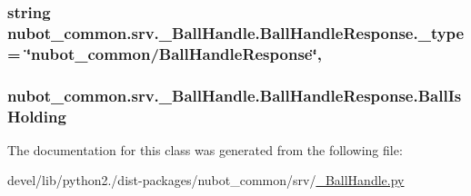 \hypertarget{classnubot__common_1_1srv_1_1__BallHandle_1_1BallHandleResponse_ac0408460ffb8e29f9d4bf262d668ecd1}{
\subsubsection[{\-\_\-type}]{\setlength{\rightskip}{0pt plus 5cm}string nubot\-\_\-common.\-srv.\-\_\-\-Ball\-Handle.\-Ball\-Handle\-Response.\-\_\-type = \char`\"{}nubot\-\_\-common/{\bf Ball\-Handle\-Response}\char`\"{}\hspace{0.3cm}{\ttfamily [static]}, {\ttfamily [private]}}}\label{classnubot__common_1_1srv_1_1__BallHandle_1_1BallHandleResponse_ac0408460ffb8e29f9d4bf262d668ecd1}
\hypertarget{classnubot__common_1_1srv_1_1__BallHandle_1_1BallHandleResponse_aa45498032f4d3d83a565db954a4a8edc}{
\subsubsection[{Ball\-Is\-Holding}]{\setlength{\rightskip}{0pt plus 5cm}nubot\-\_\-common.\-srv.\-\_\-\-Ball\-Handle.\-Ball\-Handle\-Response.\-Ball\-Is\-Holding}}\label{classnubot__common_1_1srv_1_1__BallHandle_1_1BallHandleResponse_aa45498032f4d3d83a565db954a4a8edc}


The documentation for this class was generated from the following file\-:\begin{DoxyCompactItemize}
\item 
devel/lib/python2./dist-\/packages/nubot\-\_\-common/srv/\hyperlink{__BallHandle_8py}{\-\_\-\-Ball\-Handle.\-py}\end{DoxyCompactItemize}

